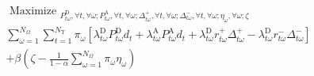\begin{equation}
\begin{array}{c}
\text { Maximize }_{P_{t \omega}^{\mathrm{D}}, \forall t, \forall \omega ; P_{t \omega}^{\mathrm{A}}, \forall t, \forall \omega ; \Delta_{t \omega}^{+}, \forall t, \forall \omega ; \Delta_{t \omega}^{-}, \forall t, \forall \omega ; \eta_{\omega}, \forall \omega ; \zeta} \\
\sum_{\omega=1}^{N_{\Omega}} \sum_{t=1}^{N_{\mathrm{T}}} \pi_{\omega}\left[\lambda_{t \omega}^{\mathrm{D}} P_{t \omega}^{\mathrm{D}} d_{t}+\lambda_{t \omega}^{\mathrm{A}} P_{t \omega}^{\mathrm{A}} d_{t}+\lambda_{t \omega}^{\mathrm{D}} r_{t \omega}^{+} \Delta_{t \omega}^{+}-\lambda_{t \omega}^{\mathrm{D}} r_{t \omega}^{-} \Delta_{t \omega}^{-}\right] 
\\+\beta\left(\zeta-\frac{1}{1-\alpha} \sum_{\omega=1}^{N_{\Omega}} \pi_{\omega} \eta_{\omega}\right)
\end{array}
\end{equation} 
